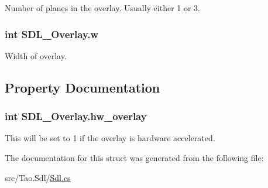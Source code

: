 Number of planes in the overlay. Usually either 1 or 3. 

\hypertarget{struct_s_d_l___overlay_aefb7ffc39023d6052156218b9395cc10}{
\subsubsection[{w}]{\setlength{\rightskip}{0pt plus 5cm}int {\bf SDL\_\-Overlay.w}}}
\label{struct_s_d_l___overlay_aefb7ffc39023d6052156218b9395cc10}


Width of overlay. 



\subsection{Property Documentation}
\hypertarget{struct_s_d_l___overlay_a9bf02d4f3968124a14c2864cd8b992a5}{
\subsubsection[{hw\_\-overlay}]{\setlength{\rightskip}{0pt plus 5cm}int SDL\_\-Overlay.hw\_\-overlay}}
\label{struct_s_d_l___overlay_a9bf02d4f3968124a14c2864cd8b992a5}


This will be set to 1 if the overlay is hardware accelerated. 



The documentation for this struct was generated from the following file:\begin{DoxyCompactItemize}
\item 
src/Tao.Sdl/\hyperlink{_sdl_8cs}{Sdl.cs}\end{DoxyCompactItemize}
